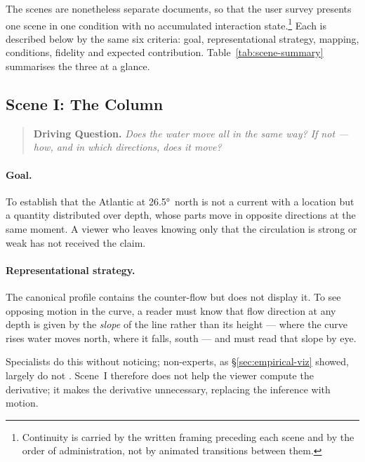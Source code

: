 The scenes are nonetheless separate documents, so that the user survey presents one scene in one condition with no accumulated interaction state.\footnote{Continuity is carried by the written framing preceding each scene and by the order of administration, not by animated transitions between them.} Each is described below by the same six criteria: goal, representational strategy, mapping, conditions, fidelity and expected contribution. Table~\ref{tab:scene-summary} summarises the three at a glance.

\subsection{Scene I: The Column}
\label{subsec:scene-column}

\begin{quote}
\textbf{Driving Question.} \emph{Does the water move all in the same way? If not --- how, and in which directions, does it move?}
\end{quote}



\paragraph{Goal.} To establish that the Atlantic at \ang{26.5}~north is not a current with a location but a quantity distributed over depth, whose parts move in opposite directions at the same moment. A viewer who leaves knowing only that the circulation is strong or weak has not received the claim.

\paragraph{Representational strategy.} The canonical profile contains the counter-flow but does not display it. To see opposing motion in the curve, a reader must know that flow direction at any depth is given by the \emph{slope} of the line rather than its height --- where the curve rises water moves north, where it falls, south --- and must read that slope by eye.

Specialists do this without noticing; non-experts, as \S\ref{sec:empirical-viz} showed, largely do not \parencite{harold2016, mcmahon2015, fischer2020}. Scene~I therefore does not help the viewer compute the derivative; it makes the derivative unnecessary, replacing the inference with motion.

